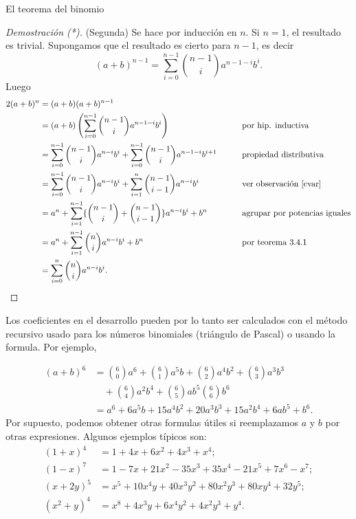 \begin{section}{El teorema del binomio}
\begin{proof}[Demostración (*)](Segunda) Se hace por inducción en $n$. Si
$n=1$, el resultado es trivial. Supongamos que el resultado es
cierto para $n-1$, es decir
$$
(a+b)^{n-1}=\sum_{i=0}^{n-1} \binom{n-1}{i}a ^{n-1-i}b^{i}.
$$
Luego
\begin{alignat*}2
(a+b)^n&= (a+b)(a+b)^{n-1}&& \\
& = (a+b)\left(\sum_{i=0}^{n-1} \binom{n-1}{i}a ^{n-1-i}b^{i}\right)&&\qquad \text{por hip. inductiva} \\
&=\sum_{i=0}^{n-1} \binom{n-1}{i}a ^{n-i}b^{i}+\sum_{i=0}^{n-1} \binom{n-1}{i}a ^{n-1-i}b^{i+1}&& \qquad \text{propiedad distributiva}\\
&=\sum_{i=0}^{n-1} \binom{n-1}{i}a ^{n-i}b^{i}+\sum_{i=1}^{n} \binom{n-1}{i-1}a ^{n-i}b^{i}&& \qquad \text{ver observación \ref{cvar}}\\
&= a^n + \sum_{i=1}^{n-1}\{ \binom{n-1}{i}+\binom{n-1}{i-1}\}a ^{n-i}b^{i}+ b^n && \qquad \text{agrupar por potencias iguales}\\
&= a^n + \sum_{i=1}^{n-1} \binom{n}{i}a ^{n-i}b^{i}+ b^n&&\qquad \text{por teorema 3.4.1} \\
&= \sum_{i=0}^{n} \binom{n}{i}a ^{n-i}b^{i}.&&\text{}
\end{alignat*}
\end{proof}

%

Los coeficientes en el desarrollo pueden por lo tanto ser
calculados con el método recursivo usado para los números
binomiales (triángulo de Pascal) o usando la formula. Por ejemplo,


$$
\begin{aligned} (a+b)^6 &= \binom{6}{0} a^6 + \binom{6}{1} a^5 b
+\binom{6}{2}a^4b^2 +
\binom{6}{3}a^3b^3 \\
&\quad + \binom{6}{4}a^2b^4+\binom{6}{5}ab^5\binom{6}{6}b^6 \\
&=  a^6 + 6 a^5 b +15a^4b^2 + 20a^3b^3 + 15a^2b^4+6ab^5+ b^6.
\end{aligned}
$$
Por supuesto, podemos obtener otras formulas útiles si
reemplazamos $a$ y $b$ por otras expresiones. Algunos ejemplos
típicos son:
$$\begin{aligned}
(1+x)^4 &= 1 + 4x + 6x^2+ 4x^3+ x^4;\\
(1-x)^7 &= 1 -7x + 21x^2- 35x^3+ 35x^4- 21x^5+ 7x^6 -x^7;\\
(x+2y)^5 &= x^5 + 10 x^4 y + 40 x^3 y^2+80 x^2 y^3+80 x y^4+32 y^5; \\
(x^2+y)^4 &= x^8 +4 x^3 y +6 x^4 y^2 +4 x^2 y^3 + y^4.
\end{aligned}
$$





\end{section}
